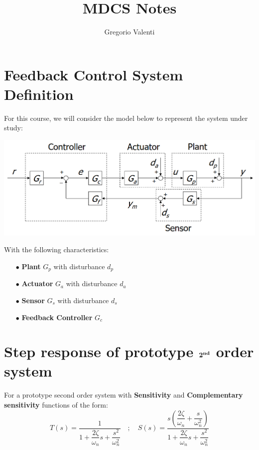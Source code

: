 \documentclass{article}
\title{MDCS Notes}
\author{Gregorio Valenti}
\date{}
\numberwithin{equation}{subsection}
\begin{document}
	\section{Feedback Control System Definition}
	\hspace{1cm}
	For this course, we will consider the model below to represent the system under study:
	
	\includegraphics[scale=1]{images/feedback_loop_description.png}

	With the following characteristics:
	\begin{enumerate}
		\item[$\bullet$] \textbf{Plant} $G_p$ with disturbance $d_p$
		\item[$\bullet$] \textbf{Actuator} $G_a$ with disturbance $d_a$
		\item[$\bullet$] \textbf{Sensor} $G_s$ with disturbance $d_s$
		\item[$\bullet$] \textbf{Feedback Controller} $G_c$ 	
	\end{enumerate}
	
	\section{Step response of prototype $\boldmath{2}^{\textbf{nd}}$ order system}
	For a prototype second order system with \textbf{Sensitivity} and \textbf{Complementary sensitivity} functions of the form:
	\begin{equation}
		T(s) = \dfrac{1}{1+\dfrac{2\zeta}{\omega_n}s+\dfrac{s^2}{\omega_n^2}} \quad ; \quad S(s) = \dfrac{s\left(\dfrac{2\zeta}{\omega_n}+\dfrac{s}{\omega_n^2}\right)}{1+\dfrac{2\zeta}{\omega_n}s+\dfrac{s^2}{\omega_n^2}}
	\end{equation}
	
\end{document}

